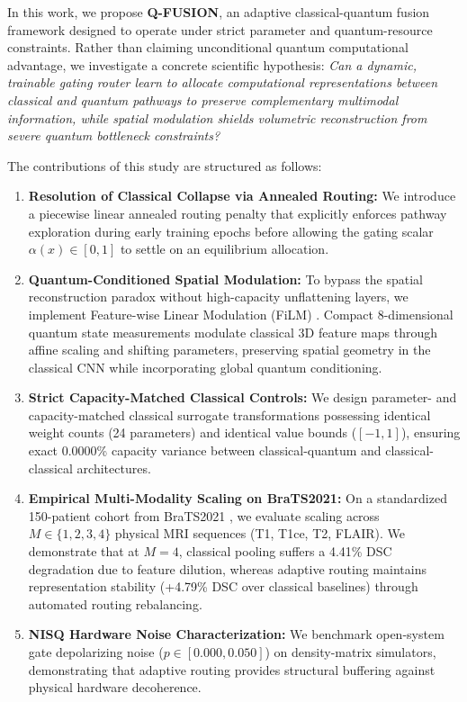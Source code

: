 In this work, we propose \textbf{Q-FUSION}, an adaptive classical-quantum fusion framework designed to operate under strict parameter and quantum-resource constraints. 
Rather than claiming unconditional quantum computational advantage, we investigate a concrete scientific hypothesis: 
\textit{Can a dynamic, trainable gating router learn to allocate computational representations between classical and quantum pathways to preserve complementary multimodal information, while spatial modulation shields volumetric reconstruction from severe quantum bottleneck constraints?}

The contributions of this study are structured as follows:
\begin{enumerate}
    \item \textbf{Resolution of Classical Collapse via Annealed Routing:} We introduce a piecewise linear annealed routing penalty that explicitly enforces pathway exploration during early training epochs before allowing the gating scalar $\alpha(x) \in [0, 1]$ to settle on an equilibrium allocation.
    \item \textbf{Quantum-Conditioned Spatial Modulation:} To bypass the spatial reconstruction paradox without high-capacity unflattening layers, we implement Feature-wise Linear Modulation (FiLM) \cite{perez2018film}. Compact 8-dimensional quantum state measurements modulate classical 3D feature maps through affine scaling and shifting parameters, preserving spatial geometry in the classical CNN while incorporating global quantum conditioning.
    \item \textbf{Strict Capacity-Matched Classical Controls:} We design parameter- and capacity-matched classical surrogate transformations possessing identical weight counts (24 parameters) and identical value bounds ($[-1, 1]$), ensuring exact 0.0000\% capacity variance between classical-quantum and classical-classical architectures.
    \item \textbf{Empirical Multi-Modality Scaling on BraTS2021:} On a standardized 150-patient cohort from BraTS2021 \cite{baid2021rsna}, we evaluate scaling across $M \in \{1, 2, 3, 4\}$ physical MRI sequences (T1, T1ce, T2, FLAIR). We demonstrate that at $M=4$, classical pooling suffers a 4.41\% DSC degradation due to feature dilution, whereas adaptive routing maintains representation stability (+4.79\% DSC over classical baselines) through automated routing rebalancing.
    \item \textbf{NISQ Hardware Noise Characterization:} We benchmark open-system gate depolarizing noise ($p \in [0.000, 0.050]$) on density-matrix simulators, demonstrating that adaptive routing provides structural buffering against physical hardware decoherence.
\end{enumerate}
